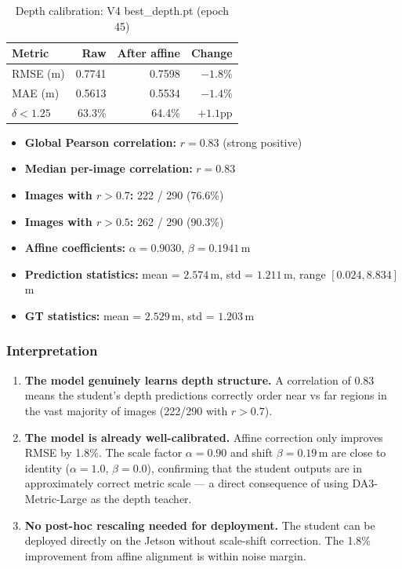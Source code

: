 \documentclass[11pt,a4paper]{article}
\begin{document}
\begin{table}[h]
\centering
\caption{Depth calibration: V4 best\_depth.pt (epoch 45)}
\label{tab:vivek-calibration}
\begin{tabular}{lrrr}
\toprule
\textbf{Metric} & \textbf{Raw} & \textbf{After affine} & \textbf{Change} \\
\midrule
RMSE (m)         & 0.7741 & 0.7598 & $-1.8\%$ \\
MAE (m)          & 0.5613 & 0.5534 & $-1.4\%$ \\
$\delta < 1.25$  & 63.3\% & 64.4\% & $+1.1$pp \\
\bottomrule
\end{tabular}
\end{table}

\begin{itemize}[nosep]
  \item \textbf{Global Pearson correlation:} $r = 0.83$ (strong positive)
  \item \textbf{Median per-image correlation:} $r = 0.83$
  \item \textbf{Images with $r > 0.7$:} 222 / 290 (76.6\%)
  \item \textbf{Images with $r > 0.5$:} 262 / 290 (90.3\%)
  \item \textbf{Affine coefficients:} $\alpha = 0.9030$, $\beta = 0.1941$\,m
  \item \textbf{Prediction statistics:} mean = $2.574$\,m, std = $1.211$\,m,
    range $[0.024, 8.834]$\,m
  \item \textbf{GT statistics:} mean = $2.529$\,m, std = $1.203$\,m
\end{itemize}

\subsubsection{Interpretation}

\begin{enumerate}[nosep]
  \item \textbf{The model genuinely learns depth structure.} A correlation of
    0.83 means the student's depth predictions correctly order near vs far
    regions in the vast majority of images (222/290 with $r > 0.7$).

  \item \textbf{The model is already well-calibrated.} Affine correction
    only improves RMSE by 1.8\%. The scale factor $\alpha = 0.90$ and
    shift $\beta = 0.19$\,m are close to identity ($\alpha = 1.0$,
    $\beta = 0.0$), confirming that the student outputs are in approximately
    correct metric scale --- a direct consequence of using DA3-Metric-Large
    as the depth teacher.

  \item \textbf{No post-hoc rescaling needed for deployment.} The student
    can be deployed directly on the Jetson without scale-shift correction.
    The 1.8\% improvement from affine alignment is within noise margin.
\end{enumerate}
\end{document}
